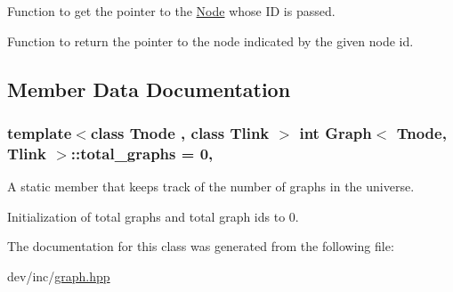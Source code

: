Function to get the pointer to the \hyperlink{classNode}{Node} whose I\-D is passed. 

Function to return the pointer to the node indicated by the given node id. 

\subsection{Member Data Documentation}
\hypertarget{classGraph_a2222ebedfb7b3cd4f1bd6717a2c1b881}{
\subsubsection[{total\-\_\-graphs}]{\setlength{\rightskip}{0pt plus 5cm}template$<$class Tnode , class Tlink $>$ int {\bf Graph}$<$ Tnode, Tlink $>$\-::total\-\_\-graphs = 0\hspace{0.3cm}{\ttfamily [static]}, {\ttfamily [private]}}}\label{classGraph_a2222ebedfb7b3cd4f1bd6717a2c1b881}


A static member that keeps track of the number of graphs in the universe. 

Initialization of total graphs and total graph ids to 0. 

The documentation for this class was generated from the following file\-:\begin{DoxyCompactItemize}
\item 
dev/inc/\hyperlink{graph_8hpp}{graph.\-hpp}\end{DoxyCompactItemize}
